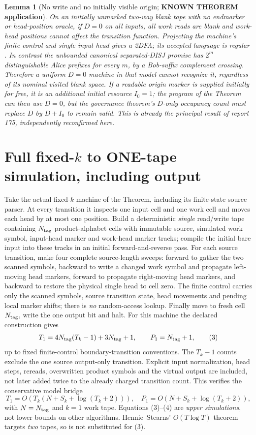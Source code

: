 \documentclass[11pt]{article}
\newtheorem{lemma}[theorem]{Lemma}
\begin{document}
\begin{lemma}[No write and no initially visible origin;
\textbf{KNOWN THEOREM application}]
On an initially unmarked two-way blank tape with no endmarker or head-position
oracle, if $D=0$ on all inputs, all work reads are blank and work-head positions
cannot affect the transition function. Projecting the machine's finite
control and single input head gives a 2DFA; its accepted language is regular
\cite{rabin,sh}. In contrast the unbounded canonical separated-DISJ
promise has $2^m$ distinguishable Alice prefixes for every $m$, by a
Bob-suffix complement crossing. Therefore a uniform $D=0$ machine in that
model cannot recognize it, \emph{regardless of its nominal visited blank
space}. If a readable origin marker is supplied initially for free, it is
an additional initial resource $I_0=1$; the program of the Theorem can then
use $D=0$, but the governance theorem's $D$-only occupancy count must replace
$D$ by $D+I_0$ to remain valid. This is already the principal result of
report 175, independently reconfirmed here.
\end{lemma}

\section{Full fixed-$k$ to ONE-tape simulation, including output}
Take the actual fixed-$k$ machine of the Theorem, including its finite-state
source parser. At every transition it inspects one input cell and one work
cell and moves each head by at most one position. Build a deterministic
\emph{single} read/write tape containing $N_{\rm tag}$ product-alphabet
cells with immutable source, simulated work symbol, input-head marker and
work-head marker tracks; compile the initial bare input into these tracks in
an initial forward-and-reverse pass. For each source transition, make four
complete source-length sweeps: forward to gather the two scanned symbols,
backward to write a changed work symbol and propagate left-moving head
markers, forward to propagate right-moving head markers, and backward to
restore the physical single head to cell zero. The finite control carries
only the scanned symbols, source transition state, head movements and
pending local marker shifts; there is \emph{no} random-access lookup.
Finally move to fresh cell $N_{\rm tag}$, write the one output bit and halt.
For this machine the declared construction gives
\[
 T_1=4N_{\rm tag}(T_k-1)+3N_{\rm tag}+1,
 \qquad P_1=N_{\rm tag}+1,\tag{3}
\]
up to fixed finite-control boundary-transition conventions. The $T_k-1$
counts exclude the one source output-only transition. Explicit input
normalization, head steps, rereads, overwritten product symbols and the
virtual output are included, not later added twice to the already charged
transition count. This verifies the conservative model bridge
\[
 T_1=O(T_k(N+S_k+\log(T_k+2))),\quad
 P_1=O(N+S_k+\log(T_k+2)),\tag{4}
\]
with $N=N_{\rm tag}$ and $k=1$ work tape. Equations (3)--(4) are
\emph{upper simulations}, not lower bounds on other algorithms.
Hennie--Stearns' $O(T\log T)$ theorem targets \emph{two} tapes, so is not
substituted for (3)\cite{hs}.
\end{document}
